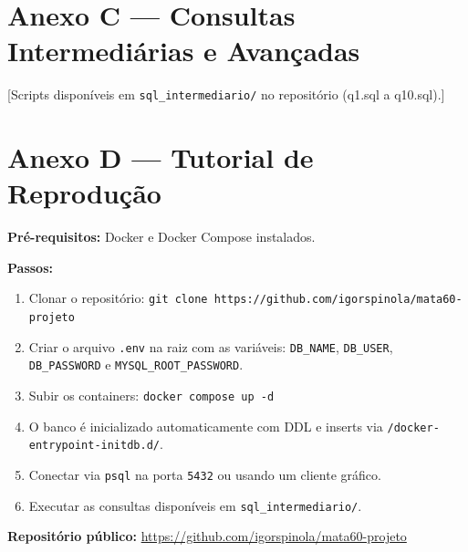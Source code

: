 \documentclass[12pt,a4paper]{article}
\begin{document}
\section{Anexo C --- Consultas Intermediárias e Avançadas}
\label{anx:queries}
% 
[Scripts disponíveis em \texttt{sql\_intermediario/} no repositório (q1.sql a q10.sql).]

\section{Anexo D --- Tutorial de Reprodução}
\label{anx:tutorial}

\textbf{Pré-requisitos:} Docker e Docker Compose instalados.

\textbf{Passos:}
\begin{enumerate}
    \item Clonar o repositório: \texttt{git clone https://github.com/igorspinola/mata60-projeto}
    \item Criar o arquivo \texttt{.env} na raiz com as variáveis:
          \texttt{DB\_NAME}, \texttt{DB\_USER}, \texttt{DB\_PASSWORD} e \texttt{MYSQL\_ROOT\_PASSWORD}.
    \item Subir os containers: \texttt{docker compose up -d}
    \item O banco é inicializado automaticamente com DDL e inserts via
          \texttt{/docker-entrypoint-initdb.d/}.
    \item Conectar via \texttt{psql} na porta \texttt{5432} ou usando um cliente gráfico.
    \item Executar as consultas disponíveis em \texttt{sql\_intermediario/}.
\end{enumerate}

\textbf{Repositório público:} \url{https://github.com/igorspinola/mata60-projeto}
\end{document}
